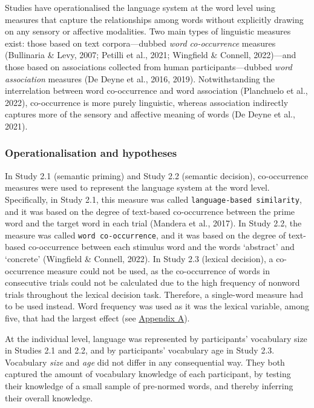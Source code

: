 \documentclass[
  12pt,
  man,floatsintext]{apa7}
\begin{document}
Studies have operationalised the language system at the word level using measures that capture the relationships among words without explicitly drawing on any sensory or affective modalities. Two main types of linguistic measures exist: those based on text corpora---dubbed \emph{word co-occurrence} measures (Bullinaria \& Levy, 2007; Petilli et al., 2021; Wingfield \& Connell, 2022)---and those based on associations collected from human participants---dubbed \emph{word association} measures (De Deyne et al., 2016, 2019). Notwithstanding the interrelation between word co-occurrence and word association (Planchuelo et al., 2022), co-occurrence is more purely linguistic, whereas association indirectly captures more of the sensory and affective meaning of words (De Deyne et al., 2021).

\hypertarget{operationalisation-and-hypotheses}{%
\subsubsection{Operationalisation and hypotheses}\label{operationalisation-and-hypotheses}}

In Study 2.1 (semantic priming) and Study 2.2 (semantic decision), co-occurrence measures were used to represent the language system at the word level. Specifically, in Study 2.1, this measure was called \texttt{language-based\ similarity}, and it was based on the degree of text-based co-occurrence between the prime word and the target word in each trial (Mandera et al., 2017). In Study 2.2, the measure was called \texttt{word\ co-occurrence}, and it was based on the degree of text-based co-occurrence between each stimulus word and the words `abstract' and `concrete' (Wingfield \& Connell, 2022). In Study 2.3 (lexical decision), a co-occurrence measure could not be used, as the co-occurrence of words in consecutive trials could not be calculated due to the high frequency of nonword trials throughout the lexical decision task. Therefore, a single-word measure had to be used instead. Word frequency was used as it was the lexical variable, among five, that had the largest effect (see \protect\hyperlink{appendix-A-lexical-covariates}{\underline{Appendix A}}).

At the individual level, language was represented by participants' vocabulary size in Studies 2.1 and 2.2, and by participants' vocabulary age in Study 2.3. Vocabulary \emph{size} and \emph{age} did not differ in any consequential way. They both captured the amount of vocabulary knowledge of each participant, by testing their knowledge of a small sample of pre-normed words, and thereby inferring their overall knowledge.
\end{document}
